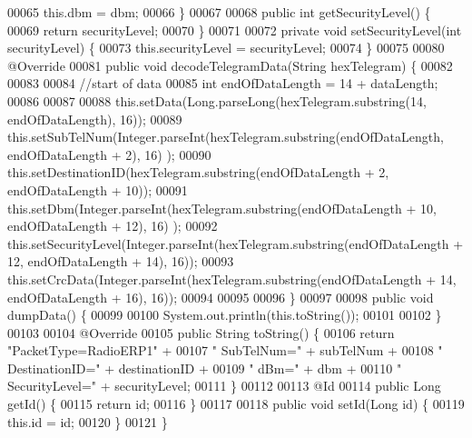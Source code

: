 \begin{DoxyCode}
00065         this.dbm = dbm;
00066     \}
00067 
00068     \textcolor{keyword}{public} \textcolor{keywordtype}{int} getSecurityLevel() \{
00069         \textcolor{keywordflow}{return} securityLevel;
00070     \}
00071 
00072     \textcolor{keyword}{private} \textcolor{keywordtype}{void} setSecurityLevel(\textcolor{keywordtype}{int} securityLevel) \{
00073         this.securityLevel = securityLevel;
00074     \}
00075 
00080     @Override
00081     \textcolor{keyword}{public} \textcolor{keywordtype}{void} decodeTelegramData(String hexTelegram) \{
00082 
00083 
00084         \textcolor{comment}{//start of data}
00085         \textcolor{keywordtype}{int} endOfDataLength = 14 + dataLength;
00086 
00087 
00088         this.setData(Long.parseLong(hexTelegram.substring(14, endOfDataLength), 16));
00089         this.setSubTelNum(Integer.parseInt(hexTelegram.substring(endOfDataLength, endOfDataLength + 2), 16)
      );
00090         this.setDestinationID(hexTelegram.substring(endOfDataLength + 2, endOfDataLength + 10));
00091         this.setDbm(Integer.parseInt(hexTelegram.substring(endOfDataLength + 10, endOfDataLength + 12), 16)
      );
00092         this.setSecurityLevel(Integer.parseInt(hexTelegram.substring(endOfDataLength + 12, endOfDataLength 
      + 14), 16));
00093         this.setCrcData(Integer.parseInt(hexTelegram.substring(endOfDataLength + 14, endOfDataLength + 16),
       16));
00094 
00095 
00096     \}
00097 
00098     \textcolor{keyword}{public} \textcolor{keywordtype}{void} dumpData() \{
00099 
00100         System.out.println(this.toString());
00101 
00102     \}
00103 
00104     @Override
00105     \textcolor{keyword}{public} String toString() \{
00106         \textcolor{keywordflow}{return} \textcolor{stringliteral}{"PacketType=RadioERP1"} +
00107                 \textcolor{stringliteral}{" SubTelNum="} + subTelNum +
00108                 \textcolor{stringliteral}{" DestinationID="} + destinationID +
00109                 \textcolor{stringliteral}{" dBm="} + dbm +
00110                 \textcolor{stringliteral}{" SecurityLevel="} + securityLevel;
00111     \}
00112 
00113     @Id
00114     \textcolor{keyword}{public} Long getId() \{
00115         \textcolor{keywordflow}{return} id;
00116     \}
00117 
00118     \textcolor{keyword}{public} \textcolor{keywordtype}{void} setId(Long \textcolor{keywordtype}{id}) \{
00119         this.\textcolor{keywordtype}{id} = id;
00120     \}
00121 \}
\end{DoxyCode}
